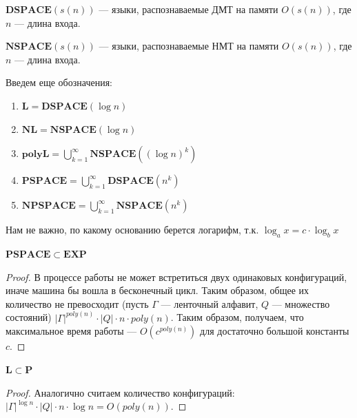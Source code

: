\begin{definition}
    \(\mathbf{DSPACE}(s(n))\) --- языки, распознаваемые ДМТ на памяти \(O(s(n))\), где \(n\) --- длина входа.
\end{definition}

\begin{definition}
    \(\mathbf{NSPACE}(s(n))\) --- языки, распознаваемые НМТ на памяти \(O(s(n))\), где \(n\) --- длина входа.
\end{definition}

Введем еще обозначения:
\begin{definition}
    \begin{enumerate}
        \item  \(\mathbf{L} = \mathbf{DSPACE}(\log n)\)
        \item \(\mathbf{NL} = \mathbf{NSPACE}(\log n)\)
        \item \(\mathbf{polyL} = \bigcup_{k = 1}^\infty \mathbf{NSPACE}((\log n)^k)\)
        \item \(\mathbf{PSPACE} = \bigcup_{k = 1}^\infty \mathbf{DSPACE}(n^k)\)
        \item \(\mathbf{NPSPACE} = \bigcup_{k = 1}^\infty \mathbf{NSPACE}(n^k)\)
    \end{enumerate}
\end{definition}

\begin{note}
    Нам не важно, по какому основанию берется логарифм, т.к. \(\log_a x = c \cdot \log_b x\)
\end{note}

\begin{proposition}
    \(\mathbf{PSPACE} \subset \mathbf{EXP}\)
\end{proposition}
\begin{proof}
    В процессе работы не может встретиться двух одинаковых конфигураций, иначе машина бы вошла в бесконечный цикл. Таким образом, общее их количество не превосходит (пусть \(\Gamma\) --- ленточный алфавит, \(Q\) --- множество состояний) \(|\Gamma|^{poly(n)}\cdot |Q| \cdot n \cdot poly(n)\). Таким образом, получаем, что максимальное время работы --- \(O(c^{poly(n)})\) для достаточно большой константы \(c\).
\end{proof}

\begin{proposition}
    \(\mathbf{L} \subset \mathbf{P}\)
\end{proposition}
\begin{proof}
    Аналогично считаем количество конфигураций: \(|\Gamma|^{\log n}\cdot |Q| \cdot n \cdot \log n = O(poly(n))\).
\end{proof}

